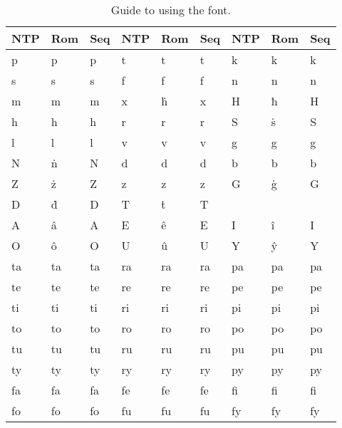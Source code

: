 \documentclass{book}
\begin{document}
\newcommand{\nrpair}[2]{#1 & #2 & #1}
\begin{savenotes}
  \begin{table}[htbp]
    \caption{Guide to using the  font. \label{table:ntpmm}}
    \centering
    \begin{tabular}{|>{\dhrfont}l|l|>{\ttfamily}l||>{\dhrfont}l|l|>{\ttfamily}l||>{\dhrfont}l|l|>{\ttfamily}l|}
      \hline
      \textnormal{NTP} & Rom & \textnormal{Seq} &
      \textnormal{NTP} & Rom & \textnormal{Seq} &
      \textnormal{NTP} & Rom & \textnormal{Seq} \\
      \hline
      \nrpair{p}{p} &
      \nrpair{t}{t} &
      \nrpair{k}{k} \\
      \nrpair{s}{s} &
      \nrpair{f}{f} &
      \nrpair{n}{n} \\
      \nrpair{m}{m} &
      \nrpair{x}{ḣ} &
      \nrpair{H}{ħ} \\
      \nrpair{h}{h} &
      \nrpair{r}{r} &
      \nrpair{S}{ṡ} \\
      \nrpair{l}{l} &
      \nrpair{v}{v} &
      \nrpair{g}{g} \\
      \nrpair{N}{ṅ} &
      \nrpair{d}{d} &
      \nrpair{b}{b} \\
      \nrpair{Z}{ż} &
      \nrpair{z}{z} &
      \nrpair{G}{ġ} \\
      \nrpair{D}{ḋ} &
      \nrpair{T}{ṫ} &
      & & \\
      \hline
      \nrpair{A}{â} &
      \nrpair{E}{ê} &
      \nrpair{I}{î} \\
      \nrpair{O}{ô} &
      \nrpair{U}{û} &
      \nrpair{Y}{ŷ} \\
      \hline
      \nrpair{ta}{ta} &
      \nrpair{ra}{ra} &
      \nrpair{pa}{pa} \\
      \nrpair{te}{te} &
      \nrpair{re}{re} &
      \nrpair{pe}{pe} \\
      \nrpair{ti}{ti} &
      \nrpair{ri}{ri} &
      \nrpair{pi}{pi} \\
      \nrpair{to}{to} &
      \nrpair{ro}{ro} &
      \nrpair{po}{po} \\
      \nrpair{tu}{tu} &
      \nrpair{ru}{ru} &
      \nrpair{pu}{pu} \\
      \nrpair{ty}{ty} &
      \nrpair{ry}{ry} &
      \nrpair{py}{py} \\
      \nrpair{fa}{fa} &
      \nrpair{fe}{fe} &
      \nrpair{fi}{fi} \\
      \nrpair{fo}{fo} &
      \nrpair{fu}{fu} &
      \nrpair{fy}{fy} \\

\end{tabular}
\end{table}
\end{savenotes}
\end{document}
